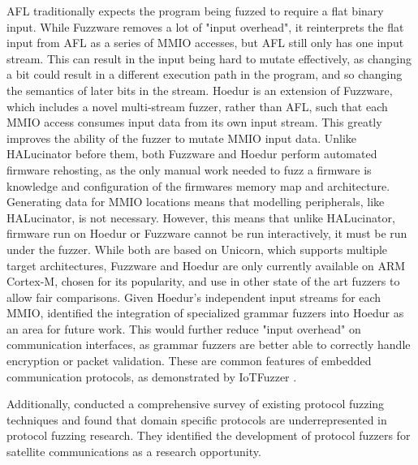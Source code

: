 \documentclass[../report.tex]{subfiles}
\begin{document}
AFL traditionally expects the program being fuzzed to require a flat binary input.
While Fuzzware removes a lot of "input overhead", it reinterprets the flat
input from AFL as a series of MMIO accesses, but AFL still only has one input
stream. This can result in the input being hard to mutate effectively, as
changing a bit could result in a different execution path in the program, and
so changing the semantics of later bits in the stream.
Hoedur \citep{Hoedur_2023} is an extension of Fuzzware, which includes a novel
multi-stream fuzzer, rather than AFL, such that each MMIO access consumes input
data from its own input stream. This greatly improves the ability of the fuzzer
to mutate MMIO input data. Unlike HALucinator before them, both Fuzzware and
Hoedur perform automated firmware rehosting, as the only manual work needed to
fuzz a firmware is knowledge and configuration of the firmwares memory map and
architecture. Generating data for MMIO locations means that modelling
peripherals, like HALucinator, is not necessary. However, this means that
unlike HALucinator, firmware run on Hoedur or Fuzzware cannot be run
interactively, it must be run under the fuzzer. While both are based on
Unicorn, which supports multiple target architectures, Fuzzware and Hoedur are
only currently available on ARM Cortex-M, chosen for its popularity, and use in
other state of the art fuzzers to allow fair comparisons. Given Hoedur's
independent input streams for each MMIO, \citet{Hoedur_2023} identified the
integration of specialized grammar fuzzers into Hoedur as an area for future
work. This would further reduce "input overhead" on communication interfaces,
as grammar fuzzers are better able to correctly handle encryption or packet
validation. These are common features of embedded communication protocols, as
demonstrated by IoTFuzzer \citep{IOTFuzzer_2018}.

Additionally, \citet{Zhang_2024} conducted a comprehensive survey of existing
protocol fuzzing techniques and found that domain specific protocols are
underrepresented in protocol fuzzing research. They identified the development
of protocol fuzzers for satellite communications as a research opportunity.
\end{document}
